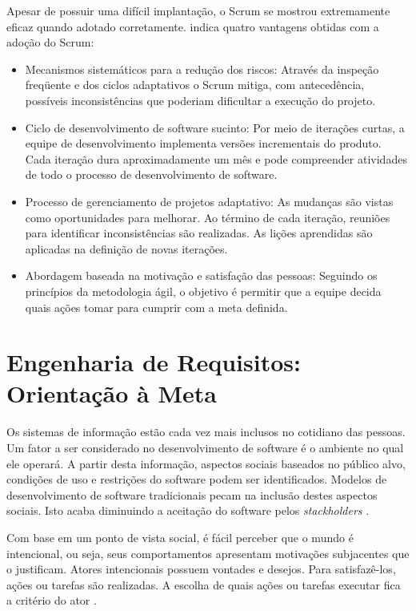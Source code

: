 Apesar de possuir uma difícil implantação, o Scrum se mostrou extremamente eficaz quando adotado corretamente. \cite{phamscrum2012} indica quatro vantagens obtidas com a adoção do Scrum:

\begin{itemize}

\item Mecanismos sistemáticos para a redução dos riscos: Através da inspeção freqüente e dos ciclos adaptativos o Scrum mitiga, com antecedência, possíveis inconsistências que poderiam dificultar a execução do projeto.

\item Ciclo de desenvolvimento de software sucinto: Por meio de iterações curtas, a equipe de desenvolvimento implementa versões incrementais do produto. Cada iteração dura aproximadamente um mês e pode compreender atividades de todo o processo de desenvolvimento de software.

\item Processo de gerenciamento de projetos adaptativo: As mudanças são vistas como oportunidades para melhorar. Ao término de cada iteração, reuniões para identificar inconsistências são realizadas. As lições aprendidas são aplicadas na definição de novas iterações.

\item Abordagem baseada na motivação e satisfação das pessoas: Seguindo os princípios da metodologia ágil, o objetivo é permitir que a equipe decida quais ações tomar para cumprir com a meta definida.      

\end{itemize}
      

\section{Engenharia de Requisitos: Orientação à Meta}
\label{meta_orient}

Os sistemas de informação estão cada vez mais inclusos no cotidiano das pessoas. Um fator a ser considerado no desenvolvimento de software é o ambiente no qual ele operará. A partir desta informação, aspectos sociais baseados no público alvo, condições de uso e restrições do software podem ser identificados. Modelos de desenvolvimento de software tradicionais pecam na inclusão destes aspectos sociais. Isto acaba diminuindo a aceitação do software pelos \textit{stackholders} \cite{borgida2009}.

Com base em um ponto de vista social, é fácil perceber que o mundo é intencional, ou seja, seus comportamentos apresentam motivações subjacentes que o justificam. Atores intencionais possuem vontades e desejos. Para satisfazê-los, ações ou tarefas são realizadas. A escolha de quais ações ou tarefas executar fica a critério do ator \cite{yu2011}.

